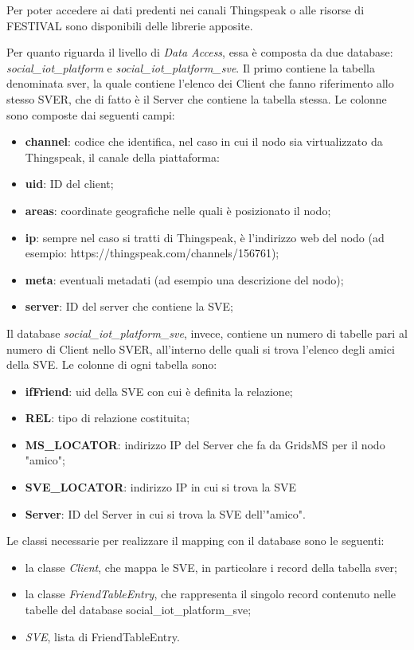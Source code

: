 Per poter accedere ai dati predenti nei canali Thingspeak o alle risorse di FESTIVAL sono disponibili delle librerie apposite.

Per quanto riguarda il livello di \textit{Data Access}, essa è composta da due database: \textit{social\_iot\_platform} e \textit{social\_iot\_platform\_sve}. Il primo contiene la tabella denominata sver, la quale contiene l'elenco dei Client che fanno riferimento allo stesso SVER, che di fatto è il Server che contiene la tabella stessa. Le colonne sono composte dai seguenti campi:

\begin{itemize}
    \item \textbf{channel}: codice che identifica, nel caso in cui il nodo sia virtualizzato da Thingspeak, il canale della piattaforma:
    \item \textbf{uid}: ID del client;
    \item \textbf{areas}: coordinate geografiche nelle quali è posizionato il nodo;
    \item \textbf{ip}: sempre nel caso si tratti di Thingspeak, è l'indirizzo web del nodo (ad esempio: https://thingspeak.com/channels/156761);
    \item \textbf{meta}: eventuali metadati (ad esempio una descrizione del nodo);
    \item \textbf{server}: ID del server che contiene la SVE;
\end{itemize}

Il database \textit{social\_iot\_platform\_sve}, invece, contiene un numero di tabelle pari al numero di Client nello SVER, all'interno delle quali si trova l'elenco degli amici della SVE. Le colonne di ogni tabella sono:

\begin{itemize}
    \item \textbf{ifFriend}: uid della SVE con cui è definita la relazione;
    \item \textbf{REL}: tipo di relazione costituita;
    \item \textbf{MS\_LOCATOR}: indirizzo IP del Server che fa da GridsMS per il nodo "amico"; 
    \item \textbf{SVE\_LOCATOR}: indirizzo IP in cui si trova la SVE 
    \item \textbf{Server}: ID del Server in cui si trova la SVE dell'"amico".
\end{itemize}

Le classi necessarie per realizzare il mapping con il database sono le seguenti: 
\begin{itemize}
    \item la classe \textit{Client}, che mappa le SVE, in particolare i record della tabella sver;
    \item la classe \textit{FriendTableEntry}, che rappresenta il singolo record contenuto nelle tabelle del database social\_iot\_platform\_sve;
    \item \textit{SVE}, lista di FriendTableEntry.
\end{itemize}


